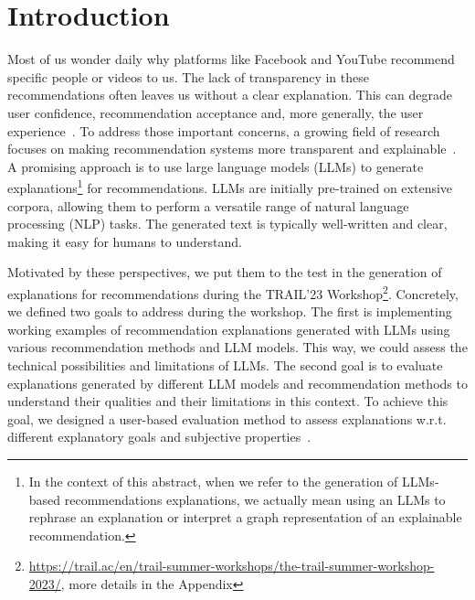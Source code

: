 \section{Introduction}

Most of us wonder daily why platforms like Facebook and YouTube recommend specific people or videos to us. The lack of transparency in these recommendations often leaves us without a clear explanation. This can degrade user confidence, recommendation acceptance and, more generally, the user experience~\cite{Tintarev2015}. To address those important concerns, a growing field of research focuses on making recommendation systems more transparent and explainable~\cite{Papadimitriou2012, Tintarev2015, Zhang2020}. A promising approach is to use large language models (LLMs) to generate explanations\footnote{In the context of this abstract, when we refer to the generation of LLMs-based recommendations explanations, we actually mean using an LLMs to rephrase an explanation or interpret a graph representation of an explainable recommendation.} for recommendations. LLMs are initially pre-trained on extensive corpora, allowing them to perform a versatile range of natural language processing (NLP) tasks\cite{bommasani2021foundationModels}. The generated text is typically well-written and clear, making it easy for humans to understand.

Motivated by these perspectives, we put them to the test in the generation of explanations for recommendations during the TRAIL’23 Workshop\footnote{\url{https://trail.ac/en/trail-summer-workshops/the-trail-summer-workshop-2023/}, more details in the Appendix}. Concretely, we defined two goals to address during the workshop.
The first is implementing working examples of recommendation explanations generated with LLMs using various recommendation methods and LLM models. This way, we could assess the technical possibilities and limitations of LLMs.
The second goal is to evaluate explanations generated by different LLM models and recommendation methods to understand their qualities and their limitations in this context. To achieve this goal, we designed a user-based evaluation method to assess explanations w.r.t. different explanatory goals and subjective properties~\cite{Tintarev2015}.
